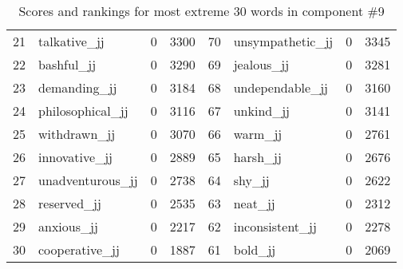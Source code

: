 \begin{table}[tbp]
\begin{tabular}{| rlr@{.}l | rlr@{.}l |}
    21 & talkative\_jj & 0 & 3300    &    70 & unsympathetic\_jj & 0 & 3345 \\
    22 & bashful\_jj & 0 & 3290    &    69 & jealous\_jj & 0 & 3281 \\
    23 & demanding\_jj & 0 & 3184    &    68 & undependable\_jj & 0 & 3160 \\
    24 & philosophical\_jj & 0 & 3116    &    67 & unkind\_jj & 0 & 3141 \\
    25 & withdrawn\_jj & 0 & 3070    &    66 & warm\_jj & 0 & 2761 \\
    26 & innovative\_jj & 0 & 2889    &    65 & harsh\_jj & 0 & 2676 \\
    27 & unadventurous\_jj & 0 & 2738    &    64 & shy\_jj & 0 & 2622 \\
    28 & reserved\_jj & 0 & 2535    &    63 & neat\_jj & 0 & 2312 \\
    29 & anxious\_jj & 0 & 2217    &    62 & inconsistent\_jj & 0 & 2278 \\
    30 & cooperative\_jj & 0 & 1887    &    61 & bold\_jj & 0 & 2069 \\
    \hline
    \end{tabular}
    \caption{Scores and rankings for most extreme 30 words in component \#9} 
\end{table}
\clearpage
